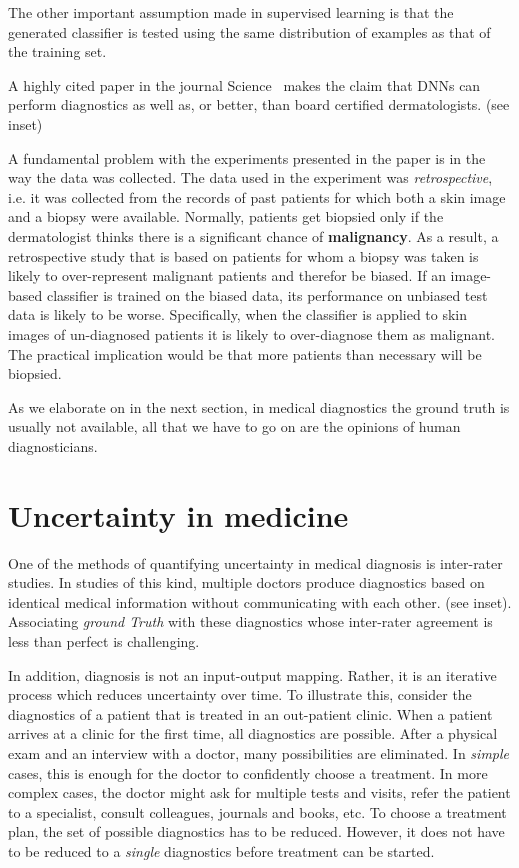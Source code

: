 \documentclass[11pt]{pnas-new}
\begin{document}
The other important assumption made in supervised learning is that the
generated classifier is tested using the same distribution of examples
as that of the training set.



A highly cited paper in the journal Science~\cite{esteva2017dermatologist}
makes the claim that DNNs can perform diagnostics as well as, or better, than board
certified dermatologists. (see inset)

A fundamental problem with the experiments presented in the paper is in the way the data was
collected. The data used in the experiment was {\em retrospective},
i.e. it was collected from the records of past patients for which both
a skin image and a biopsy were available. Normally, patients get
biopsied only if the dermatologist thinks there is a significant
chance of {\bf malignancy}. As a result, a retrospective study that is
based on patients for whom a biopsy was taken is likely to
over-represent malignant patients and therefor be biased. If an image-based classifier
is trained on the biased data, its performance on unbiased test data
is likely to be worse. Specifically, when the classifier is applied to skin
images of un-diagnosed patients it is likely to over-diagnose them as
malignant. The practical implication would be that more patients than
necessary will be biopsied. 

As we elaborate on in the next section, in medical diagnostics the
ground truth is usually not available, all that we have to go on are
the opinions of human diagnosticians.

\section{Uncertainty in medicine}


One of the methods of quantifying uncertainty in medical diagnosis is inter-rater studies.
In studies of this kind, multiple doctors produce diagnostics
based on identical medical information without communicating with each other. (see inset).
Associating {\em ground Truth} with these diagnostics whose inter-rater agreement is less than perfect is challenging.
 

In addition, diagnosis is not an input-output mapping. Rather, it
is an iterative process which reduces uncertainty over time. To
illustrate this, consider the diagnostics of a patient that is treated
in an out-patient clinic.  When a patient arrives at a clinic for
the first time, all diagnostics are possible. After a physical exam
and an interview with a doctor, many possibilities are
eliminated. In {\em simple} cases, this is enough for the doctor to
confidently choose a treatment. In more complex cases, the doctor
might ask for multiple tests and visits, refer the patient to a
specialist, consult colleagues, journals and books, etc. To choose a
treatment plan, the set of possible diagnostics has to be reduced.
However, it does not have to be reduced to a {\em single} diagnostics before treatment can be started.
\end{document}
